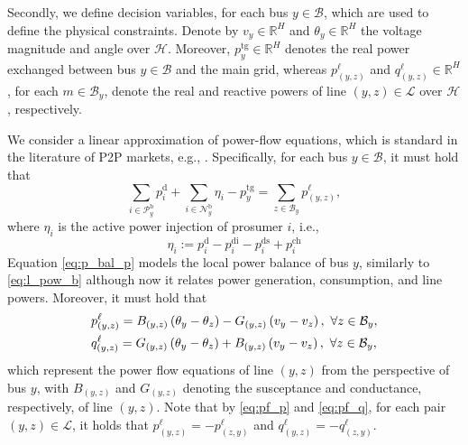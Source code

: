 \documentclass{IEEEtran}  %
\newcommand{\mc}{\mathcal}
\newcommand{\bb}{\mathbb}
\newcommand{\0}{\mathbf{0}}
\newcommand{\1}{\mathbf{1}}
\begin{document}
Secondly, we define decision variables, for each bus $y \in \mc B$, which are used to define the physical constraints. Denote by $v_y \in \bb R^H$ and $\theta_y \in \bb R^H$ the voltage magnitude and angle over $\mc H$.  Moreover, $p^{\mathrm{tg}}_y \in \mathbb{R}^H$ denotes the real power exchanged between bus $y \in \mc B$ and the main grid, whereas $p_{(y,z)}^{\ell}$ and $q_{(y,z)}^{\ell} \in \bb R^H$, for each $m \in \mc B_y$, denote the real and reactive powers of line $(y,z) \in \mc L$ over $\mc H$, respectively. 

\smallskip
We consider a linear approximation of power-flow equations, which is standard in the literature of P2P markets, e.g., \cite{yang2019,moret2020}. Specifically, for each bus $y \in \mc B$, it must hold that
\begin{equation}
\sum_{i \in \mc P_y^\mathrm{b}}p_i^{\mathrm{d}}+ \sum_{i\in \mc N_y^{\mathrm b}} \eta_i-p_{y}^{\mathrm{tg}}=\sum_{z\in \mc B_y}p_{(y,z)}^{\ell}, \label{eq:p_bal_p}
\end{equation}
where $\eta_i$ is the active power injection of prosumer $i$, i.e.,
\begin{equation}\label{eq:etai}
\eta_i:= p_i^{\mathrm d}-p_{i}^{\mathrm{di}}-{p_{i}^{\mathrm{ds}}+p_{i}^{\mathrm{ch}}}
\end{equation}
Equation \eqref{eq:p_bal_p} models the local power balance of bus $y$, similarly to \eqref{eq:l_pow_b} although now it relates power generation, consumption, and line powers. Moreover, it must hold that
\begin{subequations}
\small
\label{eq:pf_pq}
\begin{align}
&p_{(y,z)}^{\ell} = B_{(y,z)}\left({\theta_y - \theta_z} \right) - G_{(y,z)}\left(v_y - v_z \right), \, \, \forall z \in \mc B_y, \label{eq:pf_p}\\
&q_{(y,z)}^{\ell} = G_{(y,z)}\left({\theta_y - \theta_z} \right) + B_{(y,z)}\left(v_y - v_z \right), \, \,  \forall z \in \mc B_y, \label{eq:pf_q}
\end{align}
\label{eq:pf_all}
\end{subequations}
which represent the power flow equations of line $(y,z)$ from the perspective of bus $y$, with $B_{(y,z)}$ and  $G_{(y,z)}$ denoting the susceptance and conductance, respectively, of line $(y,z)$. Note that by \eqref{eq:pf_p} and \eqref{eq:pf_q}, for each pair $(y,z) \in \mc L$, it holds that $p_{(y,z)}^{\ell} = {-p}_{(z,y)}^{\ell}$ and $q_{(y,z)}^{\ell} = {-q}_{(z,y)}^{\ell}$. 
\end{document}
